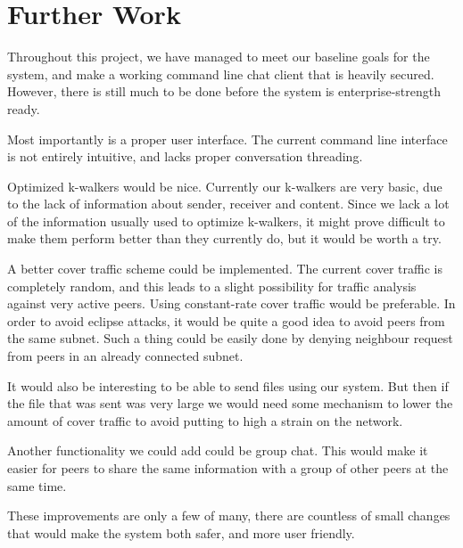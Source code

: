 \section{Further Work}

Throughout this project, we have managed to meet our baseline goals for the system, and make a working command line chat client that is heavily secured. However, there is still much to be done before the system is enterprise-strength ready.

Most importantly is a proper user interface. The current command line interface is not entirely intuitive, and lacks proper conversation threading.

Optimized k-walkers would be nice. Currently our k-walkers are very basic, due to the lack of information about sender, receiver and content. Since we lack a lot of the information usually used to optimize k-walkers, it might prove difficult to make them perform better than they currently do, but it would be worth a try.

A better cover traffic scheme could be implemented. The current cover traffic is completely random, and this leads to a slight possibility for traffic analysis against very active peers. Using constant-rate cover traffic would be preferable.
In order to avoid eclipse attacks, it would be quite a good idea to avoid peers from the same subnet. Such a thing could be easily  done by denying neighbour request from peers in an  already connected subnet.

It would also be interesting to be able to send files using our system. But then if the file that was sent was very large we would need some mechanism to lower the amount of cover traffic to avoid putting to high a strain on the network.

Another functionality we could add could be group chat. This would make it easier for peers to share the same information with a group of other peers at the same time. 

These improvements are only a few of many, there are countless of small changes that would make the system both safer, and more user friendly.